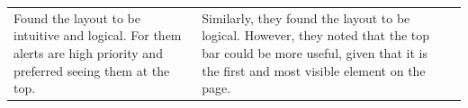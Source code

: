 \documentclass{imc-inf}
\begin{document}
\begin{longtable}{@{}>{\raggedright\arraybackslash}p{3cm}p{5.75cm}p{5.75cm}@{}}
  Found the layout to be intuitive and logical. For them alerts are high priority and preferred seeing them at the top.                                                                                                                                                                                                                                                                                                                                                                                                                                                                                                                                                                                                                                                                                                                                                                                        &
  Similarly, they found the layout to be logical. However, they noted that the top bar could be more useful, given that it is the first and most visible element on the page.                                                                                                                                                                                                                                                                                                                                                                                                                                                                                                                                                                                                                                                                                                                                                                              \\[6pt]


\end{longtable}
\end{document}
